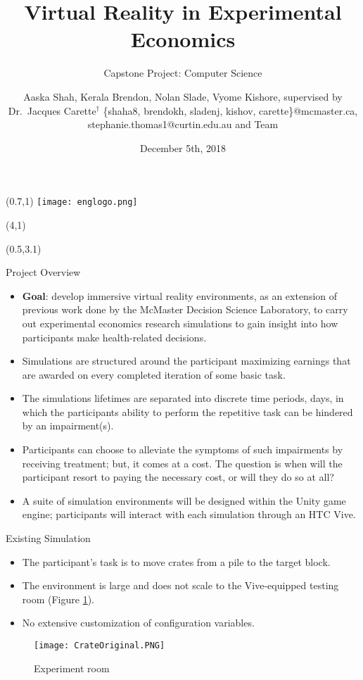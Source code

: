 \documentclass[22pt]{beamer}
\title{Virtual Reality in Experimental Economics}
\subtitle{Capstone Project: Computer Science}
\author[Shah, Brendon, Slade, Kishore \& Carette]{Aaska Shah, Kerala Brendon, Nolan Slade, Vyome Kishore, supervised by Dr.~Jacques Carette$^\dagger$ \vspace{0.3cm} \newline \small \{shaha8, brendokh, sladenj, kishov, carette\}@mcmaster.ca, stephanie.thomas1@curtin.edu.au and Team}
\institute[McMaster University]{$^\dagger$Department of Computing and Software, McMaster University

1280 Main St. W, Hamilton, Ontario, Canada L8S 4L8}
\date{December 5th, 2018}
\begin{document}

\begin{frame}[fragile]

\begin{textblock}{2}(0.7,1)
\texttt{[image: englogo.png]} %
\end{textblock}

\begin{textblock}{8}(4,1)
\titlepage
\end{textblock}

\begin{textblock}{7.25}(0.5,3.1)

\begin{block}{Project Overview}\newline
\begin{itemize}
\item \textbf{Goal}: develop immersive virtual reality environments, as an extension of previous work done by the McMaster Decision Science Laboratory, to carry out experimental economics research simulations to gain insight into how participants make health-related decisions. 
\item Simulations are structured around the participant maximizing earnings that are awarded on every completed iteration of some basic task.
\item The simulations\textsc{} lifetimes are separated into discrete time periods, days, in which the participant\textsc{}s
ability to perform the repetitive task can be hindered by an impairment(s).
\item Participants can choose to alleviate the symptoms of such impairments by receiving treatment; but, it comes at a cost. The question is when will the participant resort to paying the necessary cost, or will they do so at all? 
\item A suite of simulation environments will be designed within the Unity game engine; participants will interact with each simulation through an HTC Vive. 
\end{itemize}
\end{block}

\begin{block}{Existing Simulation}\newline
\begin{itemize}
\item The participant's task is to move crates from a pile to the target block.
\item The environment is large and does not scale to the Vive-equipped testing room (Figure \ref{fig:crate}).
\item No extensive customization of configuration variables.
\end{itemize}
\newline
\begin{figure}
  \texttt{[image: CrateOriginal.PNG]}
  \caption{Experiment room}
\label{fig:crate}
\end{figure}
\end{block}



\end{textblock}
\end{frame}
\end{document}
